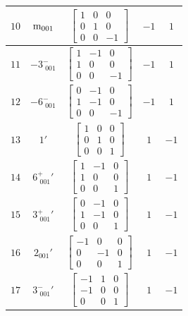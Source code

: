 \documentclass[fleqn,8pt]{jsarticle}
\begin{document}
\begin{longtable}{ccccc}
$ 10 $ & $ {\rm m}_{001} $ & $ \begin{bmatrix} 1 & 0 & 0 \\ 0 & 1 & 0 \\ 0 & 0 & -1 \end{bmatrix} $ & $ -1 $ & $ 1 $ \\ \hline
$ 11 $ & $ -3^{-}_{\,\,001} $ & $ \begin{bmatrix} 1 & -1 & 0 \\ 1 & 0 & 0 \\ 0 & 0 & -1 \end{bmatrix} $ & $ -1 $ & $ 1 $ \\ \hline
$ 12 $ & $ -6^{-}_{\,\,001} $ & $ \begin{bmatrix} 0 & -1 & 0 \\ 1 & -1 & 0 \\ 0 & 0 & -1 \end{bmatrix} $ & $ -1 $ & $ 1 $ \\ \hline
$ 13 $ & $ 1{}' $ & $ \begin{bmatrix} 1 & 0 & 0 \\ 0 & 1 & 0 \\ 0 & 0 & 1 \end{bmatrix} $ & $ 1 $ & $ -1 $ \\ \hline
$ 14 $ & $ 6^{+}_{\,\,001}{}' $ & $ \begin{bmatrix} 1 & -1 & 0 \\ 1 & 0 & 0 \\ 0 & 0 & 1 \end{bmatrix} $ & $ 1 $ & $ -1 $ \\ \hline
$ 15 $ & $ 3^{+}_{\,\,001}{}' $ & $ \begin{bmatrix} 0 & -1 & 0 \\ 1 & -1 & 0 \\ 0 & 0 & 1 \end{bmatrix} $ & $ 1 $ & $ -1 $ \\ \hline
$ 16 $ & $ 2{}_{001}{}' $ & $ \begin{bmatrix} -1 & 0 & 0 \\ 0 & -1 & 0 \\ 0 & 0 & 1 \end{bmatrix} $ & $ 1 $ & $ -1 $ \\ \hline
$ 17 $ & $ 3^{-}_{\,\,001}{}' $ & $ \begin{bmatrix} -1 & 1 & 0 \\ -1 & 0 & 0 \\ 0 & 0 & 1 \end{bmatrix} $ & $ 1 $ & $ -1 $ \\ \hline

\end{longtable}
\end{document}
